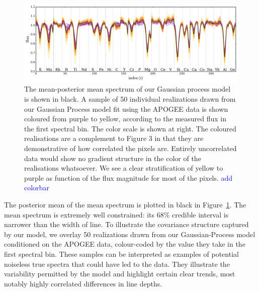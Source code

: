 \documentclass[a4paper,fleqn,usenatbib]{mnras}
\newcommand{\specmean}{{\bm m}}
\newcommand{\speccov}{{\bm S}}
\begin{document}
\begin{figure}
	\includegraphics[width=2\columnwidth]{apogee_centers_final_29502_spc_win_wid_1p5_gp_realizations.pdf}
    \caption{The mean-posterior mean spectrum of our Gaussian process model is shown in black. A sample of 50 individual realizations drawn from our Gaussian Process model fit using the APOGEE data is shown coloured from purple to yellow, according to the measured flux in the first spectral bin. The color scale is shown at right. The coloured realisations are a complement to Figure 3 in that they are demonstrative of how correlated the pixels are. Entirely uncorrelated data would show no gradient structure in the color of the realisations whatsoever. We see a clear stratification of yellow to purple as  function of the flux magnitude for most of the pixels. \textcolor{blue}{add colorbar}}
    \label{fig:gp_reals}
\end{figure}


The posterior mean of the mean spectrum is plotted in black in Figure~\ref{fig:gp_reals}. The mean spectrum is extremely well constrained: its 68\% credible interval is narrower than the width of line. To illustrate the covariance structure captured by our model, we overlay 50 realizations drawn from our Gaussian-Process model conditioned on the APOGEE data, colour-coded by the value they take in the first spectral bin. These samples can be interpreted as examples of potential noiseless true spectra that could have led to the data. They illustrate the variability permitted by the model and highlight certain clear trends, most notably highly correlated differences in line depths.
\end{document}

